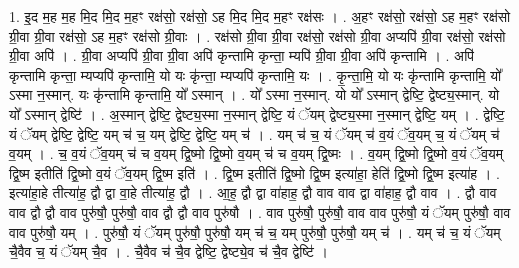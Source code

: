 \documentclass[17pt]{extarticle}
\begin{document}
1. इ॒द म॒ह म॒ह मि॒द मि॒द म॒हꣳ रक्ष॑सो॒ रक्ष॑सो॒ ऽह मि॒द मि॒द म॒हꣳ रक्ष॑सः । . अ॒हꣳ रक्ष॑सो॒ रक्ष॑सो॒ ऽह म॒हꣳ रक्ष॑सो ग्री॒वा ग्री॒वा रक्ष॑सो॒ ऽह म॒हꣳ रक्ष॑सो ग्री॒वाः । . रक्ष॑सो ग्री॒वा ग्री॒वा रक्ष॑सो॒ रक्ष॑सो ग्री॒वा अप्यपि॑ ग्री॒वा रक्ष॑सो॒ रक्ष॑सो ग्री॒वा अपि॑ । . ग्री॒वा अप्यपि॑ ग्री॒वा ग्री॒वा अपि॑ कृन्तामि कृन्ता॒ म्यपि॑ ग्री॒वा ग्री॒वा अपि॑ कृन्तामि । . अपि॑ कृन्तामि कृन्ता॒ म्यप्यपि॑ कृन्तामि॒ यो यः कृ॑न्ता॒ म्यप्यपि॑ कृन्तामि॒ यः । . कृ॒न्ता॒मि॒ यो यः कृ॑न्तामि कृन्तामि॒ यो᳚ ऽस्मा न॒स्मान्. यः कृ॑न्तामि कृन्तामि॒ यो᳚ ऽस्मान् । . यो᳚ ऽस्मा न॒स्मान्. यो यो᳚ ऽस्मान् द्वेष्टि॒ द्वेष्ट्य॒स्मान्. यो यो᳚ ऽस्मान् द्वेष्टि॑ । . अ॒स्मान् द्वेष्टि॒ द्वेष्ट्य॒स्मा न॒स्मान् द्वेष्टि॒ यं ॅयम् द्वेष्ट्य॒स्मा न॒स्मान् द्वेष्टि॒ यम् । . द्वेष्टि॒ यं ॅयम् द्वेष्टि॒ द्वेष्टि॒ यम् च॑ च॒ यम् द्वेष्टि॒ द्वेष्टि॒ यम् च॑ । . यम् च॑ च॒ यं ॅयम् च॑ व॒यं ॅव॒यम् च॒ यं ॅयम् च॑ व॒यम् । . च॒ व॒यं ॅव॒यम् च॑ च व॒यम् द्वि॒ष्मो द्वि॒ष्मो व॒यम् च॑ च व॒यम् द्वि॒ष्मः । . व॒यम् द्वि॒ष्मो द्वि॒ष्मो व॒यं ॅव॒यम् द्वि॒ष्म इतीति॑ द्वि॒ष्मो व॒यं ॅव॒यम् द्वि॒ष्म इति॑ । . द्वि॒ष्म इतीति॑ द्वि॒ष्मो द्वि॒ष्म इत्या॑हा॒ हेति॑ द्वि॒ष्मो द्वि॒ष्म इत्या॑ह । . इत्या॑हा॒हे तीत्या॑ह॒ द्वौ द्वा वा॒हे तीत्या॑ह॒ द्वौ । . आ॒ह॒ द्वौ द्वा वा॑हाह॒ द्वौ वाव वाव द्वा वा॑हाह॒ द्वौ वाव । . द्वौ वाव वाव द्वौ द्वौ वाव पुरु॑षौ॒ पुरु॑षौ॒ वाव द्वौ द्वौ वाव पुरु॑षौ । . वाव पुरु॑षौ॒ पुरु॑षौ॒ वाव वाव पुरु॑षौ॒ यं ॅयम् पुरु॑षौ॒ वाव वाव पुरु॑षौ॒ यम् । . पुरु॑षौ॒ यं ॅयम् पुरु॑षौ॒ पुरु॑षौ॒ यम् च॑ च॒ यम् पुरु॑षौ॒ पुरु॑षौ॒ यम् च॑ । . यम् च॑ च॒ यं ॅयम् चै॒वैव च॒ यं ॅयम् चै॒व । . चै॒वैव च॑ चै॒व द्वेष्टि॒ द्वेष्ट्ये॒व च॑ चै॒व द्वेष्टि॑ । \newline
\end{document}

